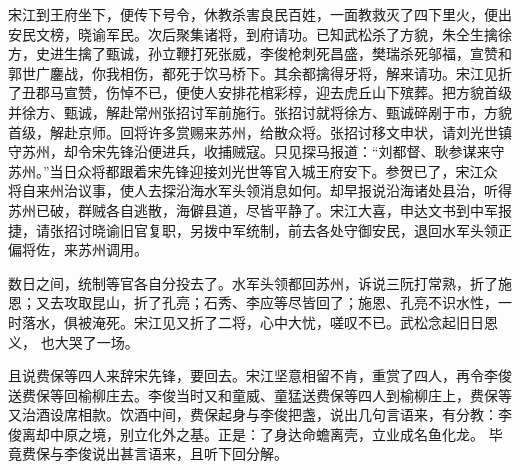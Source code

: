 宋江到王府坐下，便传下号令，休教杀害良民百姓，一面教救灭了四下里火，便出
安民文榜，晓谕军民。次后聚集诸将，到府请功。已知武松杀了方貌，朱仝生擒徐
方，史进生擒了甄诚，孙立鞭打死张威，李俊枪刺死昌盛，樊瑞杀死邬福，宣赞和
郭世广鏖战，你我相伤，都死于饮马桥下。其余都擒得牙将，解来请功。宋江见折
了丑郡马宣赞，伤悼不已，便使人安排花棺彩椁，迎去虎丘山下殡葬。把方貌首级
并徐方、甄诚，解赴常州张招讨军前施行。张招讨就将徐方、甄诚碎剐于市，方貌
首级，解赴京师。回将许多赏赐来苏州，给散众将。张招讨移文申状，请刘光世镇
守苏州，却令宋先锋沿便进兵，收捕贼寇。只见探马报道：“刘都督、耿参谋来守
苏州。”当日众将都跟着宋先锋迎接刘光世等官入城王府安下。参贺已了，宋江众
将自来州治议事，使人去探沿海水军头领消息如何。却早报说沿海诸处县治，听得
苏州已破，群贼各自逃散，海僻县道，尽皆平静了。宋江大喜，申达文书到中军报
捷，请张招讨晓谕旧官复职，另拨中军统制，前去各处守御安民，退回水军头领正
偏将佐，来苏州调用。

数日之间，统制等官各自分投去了。水军头领都回苏州，诉说三阮打常熟，折了施
恩；又去攻取昆山，折了孔亮；石秀、李应等尽皆回了；施恩、孔亮不识水性，一
时落水，俱被淹死。宋江见又折了二将，心中大忧，嗟叹不已。武松念起旧日恩义，
也大哭了一场。

且说费保等四人来辞宋先锋，要回去。宋江坚意相留不肯，重赏了四人，再令李俊
送费保等回榆柳庄去。李俊当时又和童威、童猛送费保等四人到榆柳庄上，费保等
又治酒设席相款。饮酒中间，费保起身与李俊把盏，说出几句言语来，有分教：李
俊离却中原之境，别立化外之基。正是：了身达命蟾离壳，立业成名鱼化龙。
毕竟费保与李俊说出甚言语来，且听下回分解。